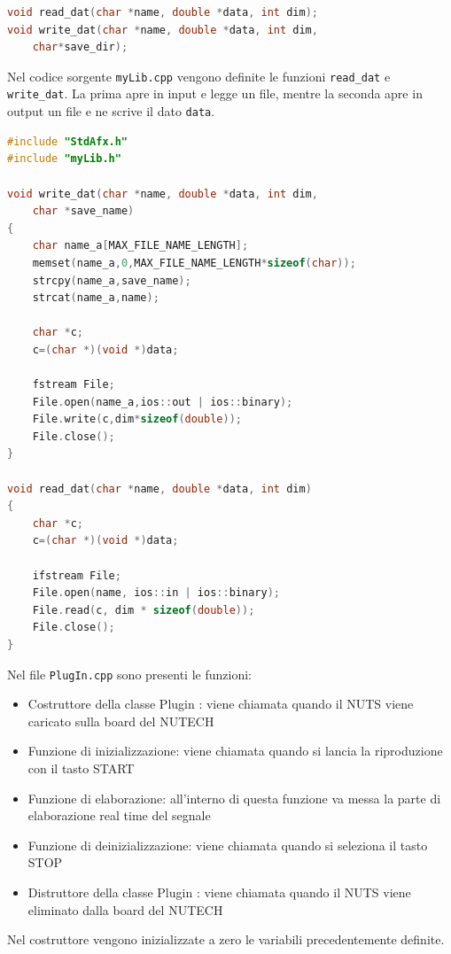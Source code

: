 \documentclass[12pt,a4paper,titlepage]{article}
\begin{document}
\begin{lstlisting}[language=cpp, label=code:myLib.h, caption = Libreria \texttt{myLib.h}, breaklines = false, captionpos = b]
void read_dat(char *name, double *data, int dim);
void write_dat(char *name, double *data, int dim, 
	char*save_dir);
\end{lstlisting}

Nel codice sorgente \texttt{myLib.cpp} vengono definite le funzioni \texttt{read\_dat} e \texttt{write\_dat}. La prima apre in input e legge un file, mentre la seconda apre in output un file e ne scrive il dato \texttt{data}.

\begin{lstlisting}[language=cpp, label=code:myLib.cpp, caption = File \texttt{myLib.cpp}, breaklines = false, breaklines = false, captionpos = b]
#include "StdAfx.h"
#include "myLib.h"

void write_dat(char *name, double *data, int dim, 
	char *save_name) 
{
	char name_a[MAX_FILE_NAME_LENGTH];
	memset(name_a,0,MAX_FILE_NAME_LENGTH*sizeof(char));
	strcpy(name_a,save_name);
	strcat(name_a,name);

	char *c;
	c=(char *)(void *)data;

	fstream File;
	File.open(name_a,ios::out | ios::binary);
	File.write(c,dim*sizeof(double));
	File.close();
}

void read_dat(char *name, double *data, int dim) 
{
	char *c;
	c=(char *)(void *)data;

	ifstream File;
	File.open(name, ios::in | ios::binary);
	File.read(c, dim * sizeof(double));
	File.close();
}
\end{lstlisting}
Nel file \texttt{PlugIn.cpp} sono presenti le funzioni:
\begin{itemize}
\item Costruttore della classe Plugin : viene chiamata quando il NUTS viene caricato sulla board del NUTECH
\item Funzione di inizializzazione: viene chiamata quando si lancia la riproduzione con il tasto START
\item Funzione di elaborazione: all’interno di questa funzione va messa la parte di elaborazione real time del segnale
\item Funzione di deinizializzazione: viene chiamata quando si seleziona il tasto STOP
\item Distruttore della classe
Plugin : viene chiamata quando il NUTS viene eliminato dalla board del NUTECH
\end{itemize}
Nel costruttore vengono inizializzate a zero le variabili precedentemente definite.
\end{document}
